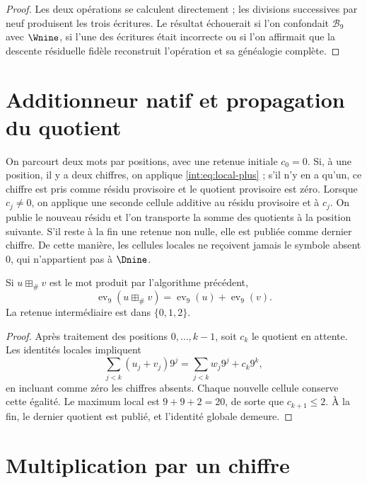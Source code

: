 \begin{proof}
Les deux opérations se calculent directement ; les divisions successives par
neuf produisent les trois écritures. Le résultat échouerait si l'on confondait
\(\mathscr B_9\) avec \(\Wnine\), si l'une des écritures était incorrecte
ou si l'on affirmait que la descente résiduelle fidèle reconstruit l'opération et sa
généalogie complète.
\end{proof}

\section{Additionneur natif et propagation du quotient}

\begin{algorithm}
On parcourt deux mots par positions, avec une retenue initiale \(c_0=0\). Si, à
une position, il y a deux chiffres, on applique \eqref{int:eq:local-plus} ; s'il n'y en a qu'un,
ce chiffre est pris comme résidu provisoire et le quotient provisoire est zéro.
Lorsque \(c_j\ne0\), on applique une seconde cellule additive au résidu provisoire
et à \(c_j\). On publie le nouveau résidu et l'on transporte la somme des
quotients à la position suivante. S'il reste à la fin une retenue non nulle, elle est
publiée comme dernier chiffre. De cette manière, les cellules locales ne reçoivent jamais le
symbole absent \(0\), qui n'appartient pas à \(\Dnine\).
\end{algorithm}

\begin{lemma}
Si $u\boxplus_\#v$ est le mot produit par l'algorithme précédent,
\[
 \operatorname{ev}_9(u\boxplus_\#v)
 =\operatorname{ev}_9(u)+\operatorname{ev}_9(v).
\]
La retenue intermédiaire est dans $\{0,1,2\}$.
\end{lemma}

\begin{proof}
Après traitement des positions $0,\ldots,k-1$, soit $c_k$ le quotient en attente.
Les identités locales impliquent
\[
 \sum_{j<k}(u_j+v_j)9^j
 =\sum_{j<k}w_j9^j+c_k9^k,
\]
en incluant comme zéro les chiffres absents. Chaque nouvelle cellule conserve cette
égalité. Le maximum local est $9+9+2=20$, de sorte que $c_{k+1}\leq2$. À la
fin, le dernier quotient est publié, et l'identité globale demeure.
\end{proof}

\section{Multiplication par un chiffre}

